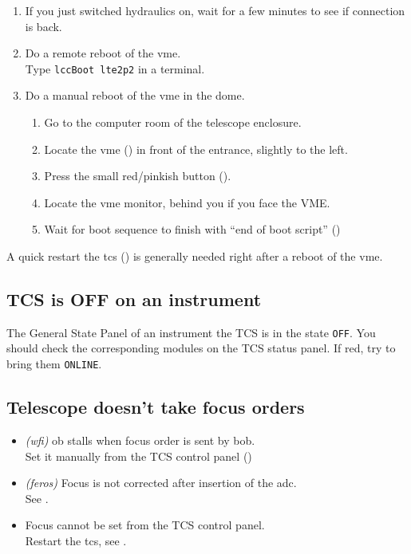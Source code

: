 \documentclass[11pt,fleqn,a4paper]{book}
\begin{document}
\begin{enumerate}
    \item If you just switched hydraulics on, wait for a few minutes to see
        if connection is back.
    \item Do a remote reboot of the \gls{vme}.\\
          Type \texttt{\gls{lccBoot} \gls{lte2p2}} in a terminal.
    \item Do a manual reboot of the \gls{vme} in the dome.
    \begin{enumerate}
        \item Go to the \gls{computer room} of the telescope enclosure.
        \item Locate the \gls{vme} () in front of the entrance, slightly to the left.
        \item Press the small red/pinkish button ().
        \item Locate the \gls{vme} monitor, behind you if you face the VME.
        \item Wait for boot sequence to finish with ``end of boot script'' ()
    \end{enumerate}
\end{enumerate}

A quick restart the \gls{tcs} () is generally needed right after a reboot of the \gls{vme}.

\subsection{TCS is OFF on an instrument}
The \gls{General State} Panel of an instrument the TCS is in the state \texttt{OFF}. You should check the corresponding modules on the \gls{TCS status panel}.  If red, try to bring them \texttt{ONLINE}.

\subsection{Telescope doesn't take focus orders}

\begin{itemize}
  \item \textit{(\gls{wfi})} \gls{ob} \gls{stall}s when \gls{focus} order is sent by \gls{bob}.\\
        Set it manually from the \gls{TCS control panel} ()
  \item \textit{(\gls{feros})} Focus is not corrected after insertion of the \gls{adc}.\\
        See .
  \item Focus cannot be set from the \gls{TCS control panel}.\\
        Restart the \gls{tcs}, see .
\end{itemize}
\end{document}
